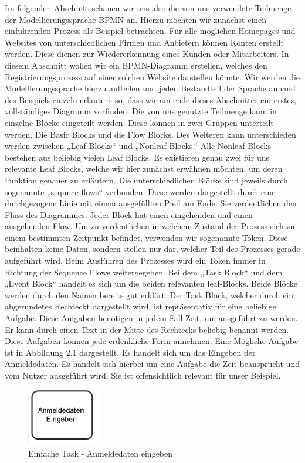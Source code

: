 Im folgenden Abschnitt schauen wir uns also die von uns verwendete Teilmenge der Modellierungssprache BPMN an. Hierzu möchten wir zunächst einen einführenden Prozess als Beispiel betrachten. Für alle möglichen Homepages und Websites von unterschiedlichen Firmen und Anbietern können Konten erstellt werden. Diese dienen zur Wiedererkennung eines Kunden oder Mitarbeiters. In diesem Abschnitt wollen wir ein BPMN-Diagramm erstellen, welches den Registrierungsprozess auf einer solchen Website darstellen könnte. Wir werden die Modellierungssprache hierzu aufteilen und jeden Bestandteil der Sprache anhand des Beispiels einzeln erläutern so, dass wir am ende dieses Abschnittes ein erstes, vollständiges Diagramm vorfinden. 
Die von uns genutzte Teilmenge kann in einzelne Blöcke eingeteilt werden. Diese können in zwei Gruppen unterteilt werden. Die Basic Blocks und die Flow Blocks. Des Weiteren kann unterschieden werden zwischen „Leaf Blocks“ und „Nonleaf Blocks.“ Alle Nonleaf Blocks bestehen aus beliebig vielen Leaf Blocks. Es existieren genau zwei für uns relevante Leaf Blocks, welche wir hier zunächst erwähnen möchten, um deren Funktion genauer zu erläutern. Die unterschiedlichen Blöcke sind jeweils durch sogenannte „sequnce flows“ verbunden. Diese werden dargestellt durch eine durchgezogene Linie mit einem ausgefüllten Pfeil am Ende. Sie verdeutlichen den Fluss des Diagrammes. Jeder Block hat einen eingehenden und einen ausgehenden Flow. Um zu verdeutlichen in welchem Zustand der Prozess sich zu einem bestimmten Zeitpunkt befindet, verwenden wir sogenannte Token. Diese beinhalten keine Daten, sondern stellen nur dar, welcher Teil des Prozesses gerade aufgeführt wird. Beim Ausführen des Prozesses wird ein Token immer in Richtung der Sequence Flows weitergegeben. Bei dem „Task Block“ und dem „Event Block“ handelt es sich um die beiden relevanten leaf-Blocks. Beide Blöcke werden durch den Namen bereits gut erklärt. Der Task Block, welcher durch ein abgerundetes Rechteckt dargestellt wird, ist repräsentativ für eine beliebige Aufgabe. Diese Aufgaben benötigen in jedem Fall Zeit, um ausgeführt zu werden. Er kann durch einen Text in der Mitte des Rechtecks beliebig benannt werden. Diese Aufgaben können jede erdenkliche Form annehmen. Eine Mögliche Aufgabe ist in Abbildung 2.1 dargestellt. Es handelt sich um das Eingeben der Anmeldedaten. Es handelt sich hierbei um eine Aufgabe die Zeit beansprucht und vom Nutzer ausgeführt wird. Sie ist offensichtlich relevant für unser Beispiel. 

\begin{figure}
\centering
\includegraphics[height=2.5cm]{Figures/Beispiel1}
\decoRule
\caption[Einfache Task]{Einfache Task - Anmeldedaten eingeben}
\label{fig:Task}
\end{figure}

